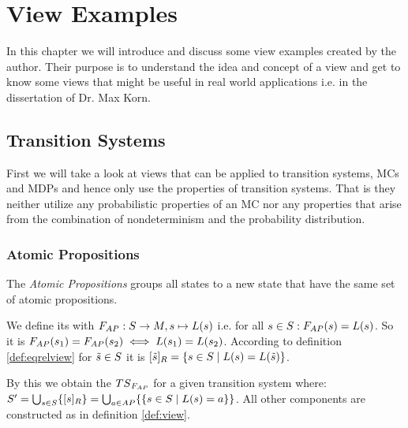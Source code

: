\documentclass[preview]{standalone}
\begin{document}
\section{View Examples}
In this chapter we will introduce and discuss some view examples created by the author. Their purpose is to understand the idea and concept of a view and get to know some views that might be useful in real world applications i.e. in the dissertation of Dr. Max Korn.
\subsection{Transition Systems}
First we will take a look at views that can be applied to transition systems, MCs and MDPs and hence only use the properties of transition systems. That is they neither utilize any probabilistic properties of an MC nor any properties that arise from the combination of nondeterminism and the probability distribution.
\subsubsection{Atomic Propositions}
The \emph{Atomic Propositions \viewNC} groups all states to a new state that have the same set of atomic propositions.

\begin{definition}
\end{definition}

We define its \grpfctN with $\gfctatomicprops : \states \to \imggrp, {\state}\mapsto{\labelingfct(\state)}$ i.e. for all ${s} \in {S} : {{{{F}}_{AP}}}({s}) = {L}({s})$. So it is ${{{{F}}_{AP}}}({s}_1) = {{{{F}}_{AP}}}({s}_2) \iff {L}({s}_1) = {L}({s}_2)$. According to definition \ref{def:eqrelview} for ${\tilde{{s}}} \in {S}$ it is ${{[{\tilde{{s}}}]_{{R}}}} = \{{s} \in {S} \mid {L}({s}) = {L}({\tilde{{s}}})\}$.

By this we obtain the \viewN ${{{TS}_{{{{F}}_{AP}}}}}$ for a given transition system \ts where: ${S}' = \bigcup_{{s} \in {S}} \{{{[{s}]_{{R}}}}\} =  \bigcup_{a \in {AP}} \{\{{s} \in {S} \mid {L}({s}) = a\}\}$. All other components are constructed as in definition \ref{def:view}.
\end{document}
